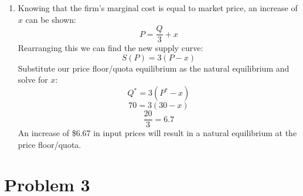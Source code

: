 \documentclass{article}
\begin{document}
\begin{enumerate}
    \item Knowing that the firm's marginal cost is equal to market price, an
        increase of \(x\) can be shown:
        \[P=\frac{Q}{3}+x\]
        Rearranging this we can find the new supply curve:
        \[S(P)=3(P-x)\]
        Substitute our price floor/quota equilibrium as the natural equilibrium
        and solve for \(x\):
        \[Q^{*}=3(P^{*}-x)\]
        \[70=3(30-x)\]
        \[\frac{20}{3}=\mathbf{6.7}\]
        An increase of \$6.67 in input prices will result in a natural
        equilibrium at the price floor/quota.
        
\end{enumerate}

\section*{Problem 3}
\end{document}
